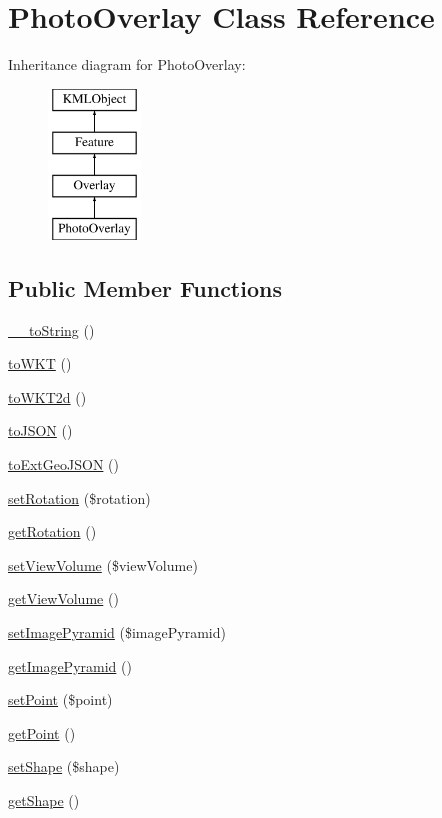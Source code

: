 \hypertarget{classPhotoOverlay}{
\section{PhotoOverlay Class Reference}
\label{df/d99/classPhotoOverlay}
}
Inheritance diagram for PhotoOverlay:\begin{figure}[H]
\begin{center}
\leavevmode
\includegraphics[height=4.000000cm]{df/d99/classPhotoOverlay}
\end{center}
\end{figure}
\subsection*{Public Member Functions}
\begin{DoxyCompactItemize}
\item 
\hyperlink{classPhotoOverlay_a39a681af8ee33d34bacf9da826456564}{\_\-\_\-toString} ()
\item 
\hyperlink{classPhotoOverlay_aa39c6700ada61c91b7c7531cd73807d0}{toWKT} ()
\item 
\hyperlink{classPhotoOverlay_a8a97a8882b2065c176ea98a9c46a99fe}{toWKT2d} ()
\item 
\hyperlink{classPhotoOverlay_a1219db38f467c148cab0972b30d9e0ed}{toJSON} ()
\item 
\hyperlink{classPhotoOverlay_ae8450d2685f7800591e64a1a54f9efcc}{toExtGeoJSON} ()
\item 
\hyperlink{classPhotoOverlay_aa5a7fcb73bd80af74a017db2b3d046ce}{setRotation} (\$rotation)
\item 
\hyperlink{classPhotoOverlay_a60ac328e318390f0ead065dcdc02ecd2}{getRotation} ()
\item 
\hyperlink{classPhotoOverlay_a7d973ad48ffa11d63e36b875b4a2b3ba}{setViewVolume} (\$viewVolume)
\item 
\hyperlink{classPhotoOverlay_a05b2866ce6fb4323560687b9df23776f}{getViewVolume} ()
\item 
\hyperlink{classPhotoOverlay_a95402d06e33904394824efbcc8e37fdf}{setImagePyramid} (\$imagePyramid)
\item 
\hyperlink{classPhotoOverlay_a5de7190f546f51140cd1f405d0469d62}{getImagePyramid} ()
\item 
\hyperlink{classPhotoOverlay_ab06031f13296d22c239e411716fa7061}{setPoint} (\$point)
\item 
\hyperlink{classPhotoOverlay_abb11bdb26b989d236b60705d9e0ad45f}{getPoint} ()
\item 
\hyperlink{classPhotoOverlay_a824d82ec4a15b283ddce3949a7ed9be2}{setShape} (\$shape)
\item 
\hyperlink{classPhotoOverlay_ae2bb907303b6fb8fe516ede8f9d51ae9}{getShape} ()
\end{DoxyCompactItemize}


